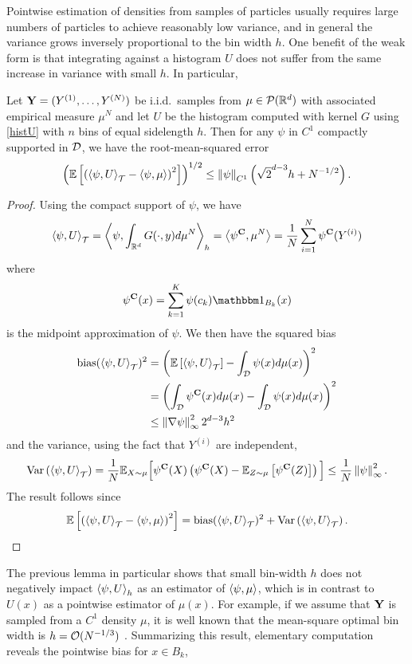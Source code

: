 \documentclass[english,reqno]{amsart}
\begin{document}
Pointwise estimation of densities from samples of particles usually requires large numbers of particles to achieve reasonably low variance, and in general the variance grows inversely proportional to the bin width $h$. One benefit of the weak form is that integrating against a histogram $U$ does not suffer from the same increase in variance with small $h$. In particular,
\begin{lemm}\label{lemm:histint}
Let $\mathbf{Y} = (Y^{(1)},\dots,Y^{(N)})$ be i.i.d.\ samples from $\mu\in {\mathcal{P}}(\mathbb{R}^d)$ with associated empirical measure $\mu^N$ and let $U$ be the histogram computed with kernel $G$ using \eqref{histU} with $n$ bins of equal sidelength $h$. Then for any $\psi$ in $C^1$ compactly supported in ${\mathcal{D}}$, we have the root-mean-squared error
\[\left(\mathbb{E}\left[\left(\left\langle \psi, U\right\rangle_{{\mathcal{T}}} - \left\langle \psi, \mu\right\rangle\right)^2\right]\right)^{1/2}\leq  \left\Vert {\psi} \right\Vert_{C^1}\left(\sqrt{2}^{d-3} h + N^{-1/2}\right).\]
\end{lemm}
\begin{proof}
Using the compact support of $\psi$, we have 
\[\left\langle \psi, U\right\rangle_{{\mathcal{T}}} = \left\langle \psi, \int_{\mathbb{R}^d} G(\cdot, y)d\mu^N\right\rangle_h = \left\langle \psi^{\mathbf{C}}, \mu^N\right\rangle = \frac{1}{N}\sum_{i=1}^N \psi^{\mathbf{C}}(Y^{(i)})\]
where 
\begin{equation}\label{psiC}
\psi^\Cbf(x)=\sum_{k=1}^K \psi(c_k) \ind{B_k}(x)
\end{equation}
is the midpoint approximation of $\psi$. We then have the squared bias
\begin{align*}
\text{bias}(\left\langle \psi, U\right\rangle_{{\mathcal{T}}})^2&= \left(\mathbb{E}\left[\left\langle \psi, U\right\rangle_{{\mathcal{T}}}\right] -\int_{\mathcal{D}} \psi(x)d\mu(x)\right)^2\\
 &= \left(\int_{\mathcal{D}} \psi^{\mathbf{C}}(x) d\mu(x) -\int_{\mathcal{D}} \psi(x)d\mu(x)\right)^2\\
&\leq \left\Vert {\nabla \psi} \right\Vert^2_\infty 2^{d-3} h^2
\end{align*}
and the variance, using the fact that $Y^{(i)}$ are independent,
\[\text{Var}\left(\left\langle \psi, U\right\rangle_{{\mathcal{T}}}\right) =\frac{1}{N}\mathbb{E}_{X\sim \mu}\Big[\psi^{\mathbf{C}}(X)\left(\psi^{\mathbf{C}}(X) - \mathbb{E}_{Z\sim \mu}\left[\psi^{\mathbf{C}}(Z)\right]\right)\Big] \leq \frac{1}{N}\left\Vert {\psi} \right\Vert_\infty^2.\]
The result follows since 
\[\mathbb{E}\left[\left(\left\langle \psi, U\right\rangle_{{\mathcal{T}}} - \left\langle \psi, \mu\right\rangle\right)^2\right] = \text{bias}(\left\langle \psi, U\right\rangle_{{\mathcal{T}}})^2+\text{Var}\left(\left\langle \psi, U\right\rangle_{{\mathcal{T}}}\right).\]
\end{proof}
%
The previous lemma in particular shows that small bin-width $h$ does not negatively impact $\left\langle \psi, U\right\rangle_h$ as an estimator of $\left\langle \psi, \mu\right\rangle$, which is in contrast to $U(x)$ as a pointwise estimator of $\mu(x)$. For example, if we assume that $\mathbf{Y}$ is sampled from a $C^1$ density $\mu$, it is well known that the mean-square optimal bin width is $h={\mathcal{O}}(N^{-1/3})$ \cite{freedman1981histogram}. Summarizing this result, elementary computation reveals the pointwise bias for $x\in B_k$, 
\end{document}
